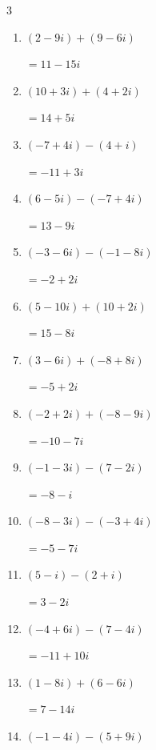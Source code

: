 \begin{multicols}{3}
\begin{enumerate}
        $\displaystyle =-3+6i$

  \item $\displaystyle (2-9i) + (9-6i)$

        $\displaystyle =11-15i$

  \item $\displaystyle (10+3i) + (4+2i)$

        $\displaystyle =14+5i$

  \item $\displaystyle (-7+4i) - (4+i)$

        $\displaystyle =-11+3i$

  \item $\displaystyle (6-5i) - (-7+4i)$

        $\displaystyle =13-9i$

  \item $\displaystyle (-3-6i) - (-1-8i)$

        $\displaystyle =-2+2i$

  \item $\displaystyle (5-10i) + (10+2i)$

        $\displaystyle =15-8i$

  \item $\displaystyle (3-6i) + (-8+8i)$

        $\displaystyle =-5+2i$

  \item $\displaystyle (-2+2i) + (-8-9i)$

        $\displaystyle =-10-7i$

  \item $\displaystyle (-1-3i) - (7-2i)$

        $\displaystyle =-8-i$

  \item $\displaystyle (-8-3i) - (-3+4i)$

        $\displaystyle =-5-7i$

  \item $\displaystyle (5-i) - (2+i)$

        $\displaystyle =3-2i$

  \item $\displaystyle (-4+6i) - (7-4i)$

        $\displaystyle =-11+10i$

  \item $\displaystyle (1-8i) + (6-6i)$

        $\displaystyle =7-14i$

  \item $\displaystyle (-1-4i) - (5+9i)$


\end{enumerate}
\end{multicols}
